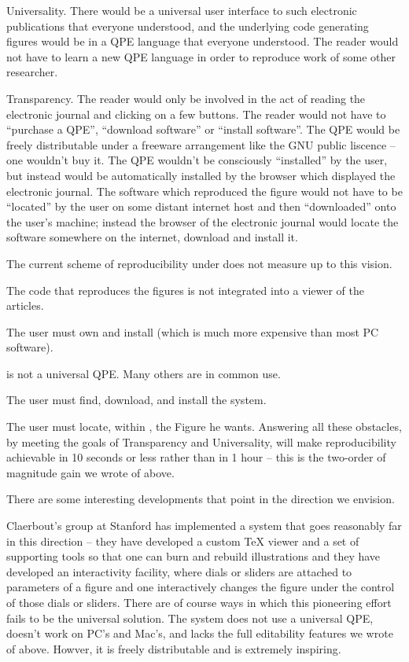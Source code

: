 \bitem
\item Universality.  There would be a universal user interface
to such electronic publications that everyone understood, and the
underlying code generating figures would be in a QPE language that
everyone understood. The reader would not have to learn a new
QPE language in order to reproduce work of some other researcher.

\item Transparency. The reader would only be involved
in the act of reading the
electronic journal and clicking on a few buttons.
The reader would not have to ``purchase a QPE'',
``download software'' or ``install software''. The QPE would
be freely distributable under a freeware arrangement
like the GNU public liscence -- one
wouldn't buy it.  The QPE wouldn't be consciously ``installed''
by the user, but instead would be automatically installed
by the browser which displayed the electronic journal. The software
which reproduced the figure would  not have to be ``located'' by the user
on some distant internet host and then
``downloaded'' onto the user's machine; instead the browser of
the electronic journal would locate the software somewhere on
the internet, download and install it.

\eitem 
The current scheme of reproducibility under \WaveLab does not measure
up to this vision.
\bitem
\item  The code that reproduces the figures is not integrated into
a viewer of the articles.
\item The user must own and install \Matlab (which is much more
expensive than most PC software).
\item \Matlab is not a universal QPE.  
Many others are in common use.
\item The user must find, download, and install the \WaveLab system.
\item The user must locate, within \WaveLab, the Figure he wants.
\eitem
Answering all these obstacles, by meeting the goals of Transparency
and Universality, will make reproducibility achievable in
10 seconds or less rather than in 1 hour -- this is the two-order
of magnitude gain we wrote of above.

There are some interesting developments that point in the direction
we envision. 

Claerbout's group at Stanford has implemented a system that goes
reasonably far in this direction -- they have developed a custom TeX viewer
and a set of supporting tools so that one can burn and
rebuild illustrations and they have developed an interactivity facility,
where dials or sliders are attached to parameters of a figure
and one interactively changes the figure under the control
of those dials or sliders.  There are of course
ways in which this pioneering effort fails to
be the universal solution. 
The system does not use a universal QPE,
doesn't work on PC's and Mac's, 
and lacks the full editability features we wrote of above.
Howver, it is freely distributable and is extremely inspiring.
 
